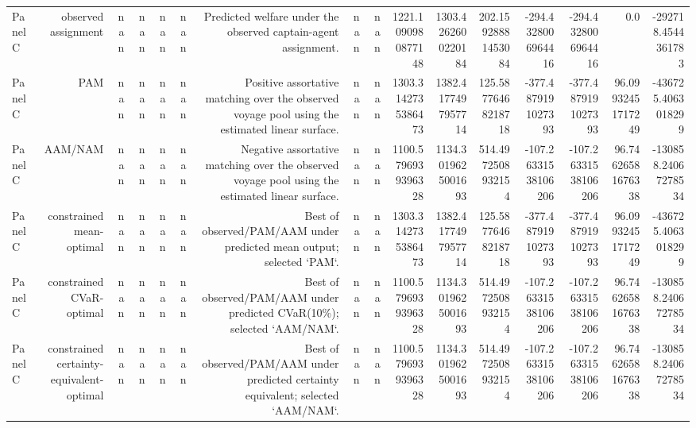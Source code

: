 \documentclass{article}
\begin{document}
\begin{tabular}{lrrrrrrrrrrrrrrr}
Panel C & observed assignment & nan & nan & nan & nan & Predicted welfare under the observed captain-agent assignment. & nan & nan & 1221.1090980877148 & 1303.4262600220184 & 202.15928881453084 & -294.4328006964416 & -294.4328006964416 & 0.0 & -292718.4544361783 \\
Panel C & PAM & nan & nan & nan & nan & Positive assortative matching over the observed voyage pool using the estimated linear surface. & nan & nan & 1303.3142735386473 & 1382.4177497957714 & 125.58776468218718 & -377.4879191027393 & -377.4879191027393 & 96.09932451717249 & -436725.4063018299 \\
Panel C & AAM/NAM & nan & nan & nan & nan & Negative assortative matching over the observed voyage pool using the estimated linear surface. & nan & nan & 1100.5796939396328 & 1134.3019625001693 & 514.4972508932154 & -107.26331538106206 & -107.26331538106206 & 96.74626581676338 & -130858.24067278534 \\
Panel C & constrained mean-optimal & nan & nan & nan & nan & Best of observed/PAM/AAM under predicted mean output; selected `PAM`. & nan & nan & 1303.3142735386473 & 1382.4177497957714 & 125.58776468218718 & -377.4879191027393 & -377.4879191027393 & 96.09932451717249 & -436725.4063018299 \\
Panel C & constrained CVaR-optimal & nan & nan & nan & nan & Best of observed/PAM/AAM under predicted CVaR(10\%); selected `AAM/NAM`. & nan & nan & 1100.5796939396328 & 1134.3019625001693 & 514.4972508932154 & -107.26331538106206 & -107.26331538106206 & 96.74626581676338 & -130858.24067278534 \\
Panel C & constrained certainty-equivalent-optimal & nan & nan & nan & nan & Best of observed/PAM/AAM under predicted certainty equivalent; selected `AAM/NAM`. & nan & nan & 1100.5796939396328 & 1134.3019625001693 & 514.4972508932154 & -107.26331538106206 & -107.26331538106206 & 96.74626581676338 & -130858.24067278534 \\
\hline
\end{tabular}
\end{document}
